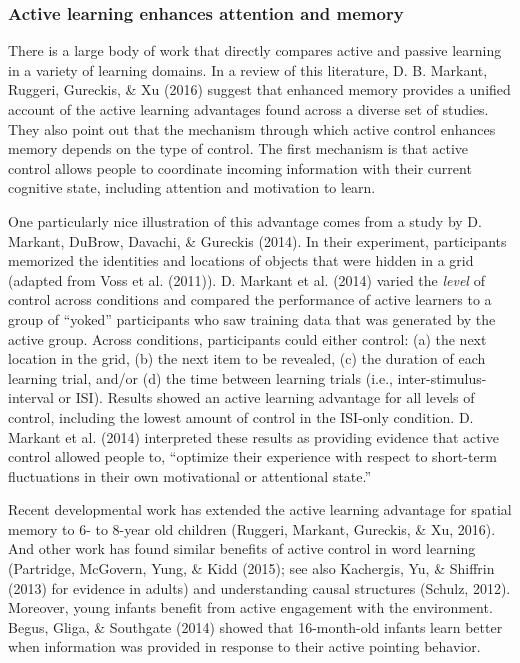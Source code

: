 \documentclass[a4paper,man,apacite,floatsintext]{apa6}
\begin{document}
\subsubsection{Active learning enhances attention and
memory}\label{active-learning-enhances-attention-and-memory}

There is a large body of work that directly compares active and passive
learning in a variety of learning domains. In a review of this
literature, D. B. Markant, Ruggeri, Gureckis, \& Xu (2016) suggest that
enhanced memory provides a unified account of the active learning
advantages found across a diverse set of studies. They also point out
that the mechanism through which active control enhances memory depends
on the type of control. The first mechanism is that active control
allows people to coordinate incoming information with their current
cognitive state, including attention and motivation to learn.

One particularly nice illustration of this advantage comes from a study
by D. Markant, DuBrow, Davachi, \& Gureckis (2014). In their experiment,
participants memorized the identities and locations of objects that were
hidden in a grid (adapted from Voss et al. (2011)). D. Markant et al.
(2014) varied the \emph{level} of control across conditions and compared
the performance of active learners to a group of ``yoked'' participants
who saw training data that was generated by the active group. Across
conditions, participants could either control: (a) the next location in
the grid, (b) the next item to be revealed, (c) the duration of each
learning trial, and/or (d) the time between learning trials (i.e.,
inter-stimulus-interval or ISI). Results showed an active learning
advantage for all levels of control, including the lowest amount of
control in the ISI-only condition. D. Markant et al. (2014) interpreted
these results as providing evidence that active control allowed people
to, ``optimize their experience with respect to short-term fluctuations
in their own motivational or attentional state.''

Recent developmental work has extended the active learning advantage for
spatial memory to 6- to 8-year old children (Ruggeri, Markant, Gureckis,
\& Xu, 2016). And other work has found similar benefits of active
control in word learning (Partridge, McGovern, Yung, \& Kidd (2015); see
also Kachergis, Yu, \& Shiffrin (2013) for evidence in adults) and
understanding causal structures (Schulz, 2012). Moreover, young infants
benefit from active engagement with the environment. Begus, Gliga, \&
Southgate (2014) showed that 16-month-old infants learn better when
information was provided in response to their active pointing behavior.
\end{document}
